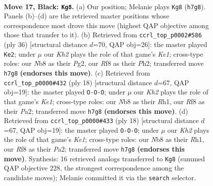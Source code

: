 \documentclass[11pt]{article}
\begin{document}
\clearpage

\begin{figure}[p]\centering
\begin{subfigure}{0.46\textwidth}\centering
\resizebox{\linewidth}{!}{%
\newchessgame
\chessboard[
  setfen={rn3r2/1pp1bp1k/p6P/4P1p1/P1p3b1/2N1P3/1P1N4/R3KB1R b KQ - 0 17},
  showmover=false,
  pgfstyle=straightmove, color=movearrow, markmove={h7-g8}
]}
\caption{}
\end{subfigure}\hfill
\begin{subfigure}{0.46\textwidth}\centering
\resizebox{\linewidth}{!}{%
\newchessgame
\chessboard[
  setfen={rn1r2k1/1p2pp1p/5b2/1B1P1p2/8/pRN1P3/P4PPP/4K2R w K - 0 19},
  showmover=false,
  pgfstyle=straightmove, color=movearrow, markmove={e1-e2}
]}
\caption{}
\end{subfigure}
\\[4pt]
\begin{subfigure}{0.46\textwidth}\centering
\resizebox{\linewidth}{!}{%
\newchessgame
\chessboard[
  setfen={r1b1k1nr/ppp1b1pp/3p4/8/2Bn1B2/2N5/PPP3PP/R3K1NR w KQkq - 0 10},
  showmover=false,
  pgfstyle=straightmove, color=movearrow, markmove={e1-c1}
]}
\caption{}
\end{subfigure}\hfill
\begin{subfigure}{0.46\textwidth}\centering
\resizebox{\linewidth}{!}{%
\newchessgame
\chessboard[
  setfen={r1b1k1nr/ppp1b1pp/3p4/8/2Bn1B2/2N5/PPP3PP/R3K1NR w KQkq - 0 10},
  showmover=false,
  pgfstyle=straightmove, color=movearrow, markmove={e1-c1}
]}
\caption{}
\end{subfigure}
\caption{\textbf{Move 17, Black: \texttt{Kg8}.} (a) Our position; Melanie plays \texttt{Kg8} (\texttt{h7g8}). Panels (b)--(d) are the retrieved master positions whose correspondence most drove this move (highest QAP objective among those that transfer to it). (b) Retrieved from \texttt{ccrl\_top\_p0002\#586} (ply 36) [structural distance $d$=70, QAP obj=26]: the master played \texttt{Ke2}; under $\mu$ our \emph{Kh2} plays the role of that game's \emph{Ke1}; cross-type roles: our \emph{N}b8 as their \emph{P}g2, our \emph{R}f8 as their \emph{P}h2; transferred move \texttt{h7g8} \textbf{(endorses this move)}. (c) Retrieved from \texttt{ccrl\_top\_p0000\#432} (ply 18) [structural distance $d$=67, QAP obj=19]: the master played \texttt{O-O-O}; under $\mu$ our \emph{Kh2} plays the role of that game's \emph{Ke1}; cross-type roles: our \emph{N}b8 as their \emph{R}h1, our \emph{R}f8 as their \emph{P}a2; transferred move \texttt{h7g8} \textbf{(endorses this move)}. (d) Retrieved from \texttt{ccrl\_top\_p0000\#433} (ply 18) [structural distance $d$=67, QAP obj=19]: the master played \texttt{O-O-O}; under $\mu$ our \emph{Kh2} plays the role of that game's \emph{Ke1}; cross-type roles: our \emph{N}b8 as their \emph{R}h1, our \emph{R}f8 as their \emph{P}a2; transferred move \texttt{h7g8} \textbf{(endorses this move)}. Synthesis: 16 retrieved analogs transferred to \texttt{Kg8} (summed QAP objective 228, the strongest correspondence among the candidate moves); Melanie committed it via the \texttt{search} selector.}
\label{fig:thought-m33}
\end{figure}
\end{document}
